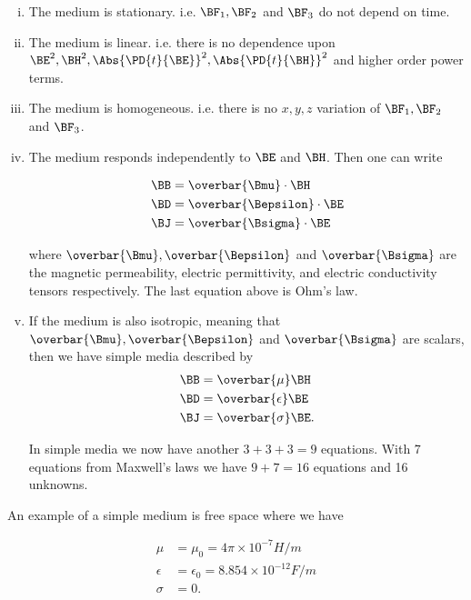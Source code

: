 \begin{enumerate}[(i)]
\item The medium is stationary.  i.e. \( \BF_1, \BF_2 \) and \( \BF_3 \) do not depend on time.
\item The medium is linear.  i.e. there is no dependence upon \( \BE^2, \BH^2, \Abs{\PD{t}{\BE}}^2, \Abs{\PD{t}{\BH}}^2 \) and higher order power terms.
\item The medium is homogeneous.  i.e. there is no \( x, y, z\) variation of \( \BF_1, \BF_2 \) and \( \BF_3 \).
\item The medium responds independently to \( \BE \) and \( \BH \).  Then one can write

\begin{equation}\label{eqn:uwavesLecture1:740}
\begin{aligned}
\BB &= \overbar{\Bmu} \cdot \BH \\
\BD &= \overbar{\Bepsilon} \cdot \BE \\
\BJ &= \overbar{\Bsigma} \cdot \BE
\end{aligned}
\end{equation}

where \( \overbar{\Bmu}, \overbar{\Bepsilon} \) and \( \overbar{\Bsigma} \) are the magnetic permeability, electric permittivity, and electric conductivity tensors respectively.  The last equation above is Ohm's law.
\item If the medium is also isotropic, meaning that \( \overbar{\Bmu}, \overbar{\Bepsilon} \) and \( \overbar{\Bsigma} \) are scalars, then we have simple media described by
\begin{equation}\label{eqn:uwavesLecture1:760}
\begin{aligned}
\BB &= \overbar{\mu}  \BH \\
\BD &= \overbar{\epsilon}  \BE \\
\BJ &= \overbar{\sigma}  \BE.
\end{aligned}
\end{equation}

In simple media we now have another \( 3 + 3 + 3 = 9 \) equations.  With 7 equations from Maxwell's laws we have \( 9 + 7 = 16 \) equations and 16 unknowns.
\end{enumerate}

An example of a simple medium is free space where we have

\begin{equation}\label{eqn:uwavesLecture1:780}
\begin{aligned}
\mu &= \mu_0 = 4 \pi \times 10^{-7} \si{H/m} \\
\epsilon &= \epsilon_0 = 8.854 \times 10^{-12} \si{F/m} \\
\sigma &= 0.
\end{aligned}
\end{equation}

